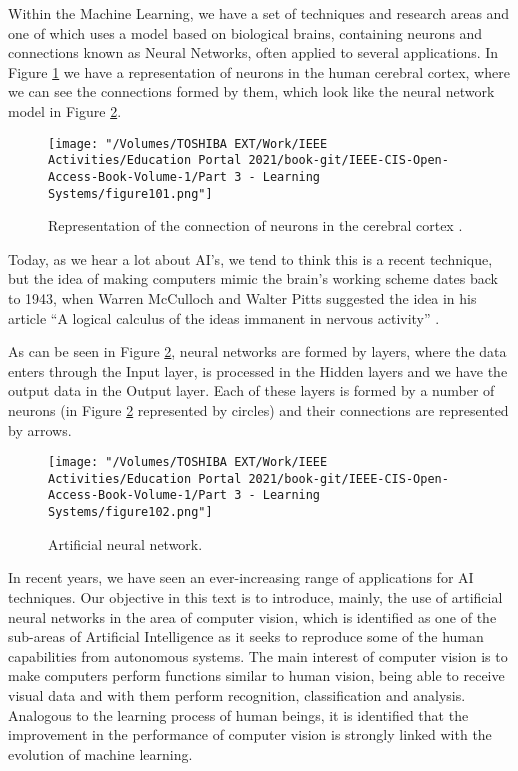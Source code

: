 Within the Machine Learning, we have a set of techniques and research areas and one of which uses a model based on biological brains, containing neurons and connections known as Neural Networks, often applied to several applications. In Figure  \ref{fig:figure101} we have a representation of neurons in the human cerebral cortex, where we can see the connections formed by them, which look like the neural network model in Figure \ref{fig:figure102}.

\begin{figure}
    \centering
    \texttt{[image: "/Volumes/TOSHIBA EXT/Work/IEEE Activities/Education Portal 2021/book-git/IEEE-CIS-Open-Access-Book-Volume-1/Part 3 - Learning Systems/figure101.png"]}
    \caption{Representation of the connection of neurons in the cerebral cortex \cite{cajal}.}
    \label{fig:figure101}
\end{figure}

Today, as we hear a lot about AI's, we tend to think this is a recent technique, but the idea of making computers mimic the brain's working scheme dates back to 1943, when Warren McCulloch and Walter Pitts suggested the idea in his article “A logical calculus of the ideas immanent in nervous activity” \cite{mcculloch1943}.

As can be seen in Figure \ref{fig:figure102}, neural networks are formed by layers, where the data enters through the Input layer, is processed in the Hidden layers and we have the output data in the Output layer. Each of these layers is formed by a number of neurons (in Figure \ref{fig:figure102} represented by circles) and their connections are represented by arrows.

\begin{figure}
    \centering
    \texttt{[image: "/Volumes/TOSHIBA EXT/Work/IEEE Activities/Education Portal 2021/book-git/IEEE-CIS-Open-Access-Book-Volume-1/Part 3 - Learning Systems/figure102.png"]}
    \caption{Artificial neural network.}
    \label{fig:figure102}
\end{figure}

In recent years, we have seen an ever-increasing range of applications for AI techniques. Our objective in this text is to introduce, mainly, the use of artificial neural networks in the area of computer vision, which is identified as one of the sub-areas of Artificial Intelligence as it seeks to reproduce some of the human capabilities from autonomous systems. The main interest of computer vision is to make computers perform functions similar to human vision, being able to receive visual data and with them perform recognition, classification and analysis. Analogous to the learning process of human beings, it is identified that the improvement in the performance of computer vision is strongly linked with the evolution of machine learning.

